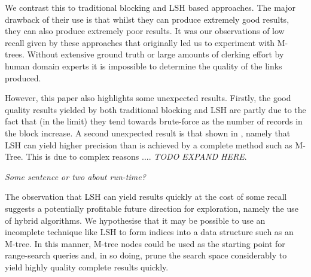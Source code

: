 \documentclass{llncs}
\begin{document}
We contrast this to traditional blocking and LSH based approaches. The major drawback of their use is that whilst they can produce extremely good results, they can also produce extremely poor results. It was our observations of low recall given by these approaches that originally led us to experiment with M-trees. Without extensive ground truth or large amounts of clerking effort by human domain experts it is impossible to determine the quality of the links produced. 

However, this paper also highlights some unexpected results. Firstly, the good quality results yielded by both traditional blocking and LSH are partly due to the fact that (in the limit) they tend towards brute-force as the number of records in the block increase. A second unexpected result is that shown in , namely that LSH can yield higher precision than is achieved by a complete method such as M-Tree. This is due to complex reasons .... \emph{TODO EXPAND HERE}.

\emph{Some sentence or two about run-time?}

The observation that LSH can yield results quickly at the cost of some recall suggests a potentially profitable future direction for exploration, namely the use of hybrid algorithms. We hypothesise that it may be possible to use an incomplete technique like LSH to form indices into a data structure such as an M-tree. In this manner, M-tree nodes could be used as the starting point for range-search queries and, in so doing, prune the search space considerably to yield highly quality complete results quickly.




 

\end{document}
